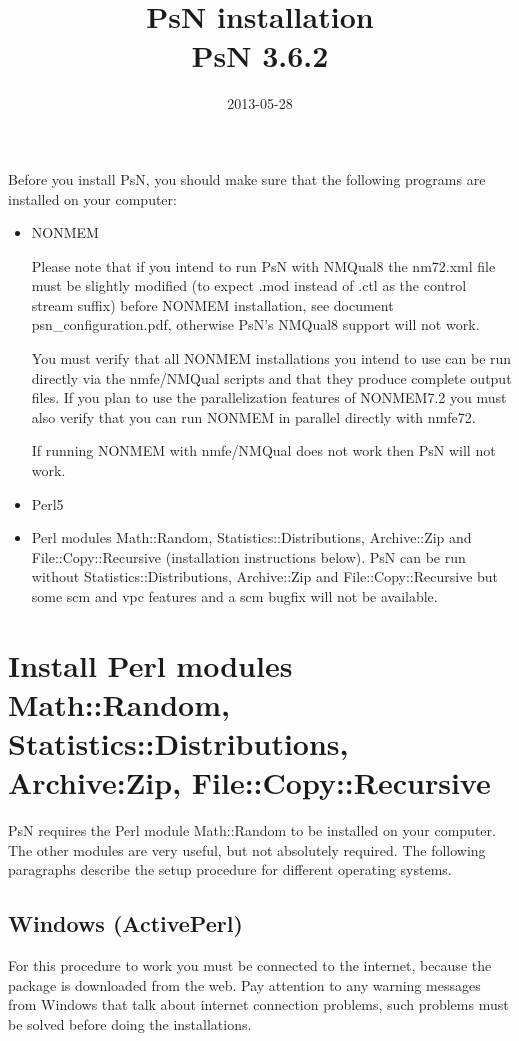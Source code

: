 \documentclass[a4paper,12pt]{article}
\title{PsN installation\\ \vspace{2 mm} {\large PsN 3.6.2}}
\date{2013-05-28}
\begin{document}
\maketitle

Before you install PsN, you should make sure that the following programs are installed on your computer:
\begin{itemize}
	\item NONMEM 

Please note that if you intend to run PsN with NMQual8 the nm72.xml file must be slightly modified (to expect .mod instead of .ctl as the control stream suffix) before NONMEM installation, see document psn\_configuration.pdf, otherwise PsN's NMQual8 support will not work.

You must verify that all NONMEM installations you intend to use can be run directly via the nmfe/NMQual scripts and that they produce complete output files. If you plan to use the parallelization features of NONMEM7.2 you must also verify that you can run NONMEM in parallel directly with nmfe72.

If running NONMEM with nmfe/NMQual does not work then PsN will not work. 
	\item Perl5
	\item Perl modules Math::Random, Statistics::Distributions, Archive::Zip and File::Copy::Recursive (installation instructions below). PsN can be run without Statistics::Distributions, Archive::Zip and File::Copy::Recursive but some scm and vpc features and a scm bugfix will not be available.
\end{itemize}

\section{Install Perl modules Math::Random, Statistics::Distributions, Archive:Zip, File::Copy::Recursive}
PsN requires the Perl module Math::Random to be installed on your computer. The other modules are very useful, but not absolutely required. The following paragraphs describe the setup procedure for different operating systems. 
\subsection{Windows (ActivePerl)}
For this procedure to work you must be connected to the internet, because the package is downloaded from the web. Pay attention to any warning messages from Windows that talk about internet connection problems, such problems must be solved before doing the installations.
\end{document}
